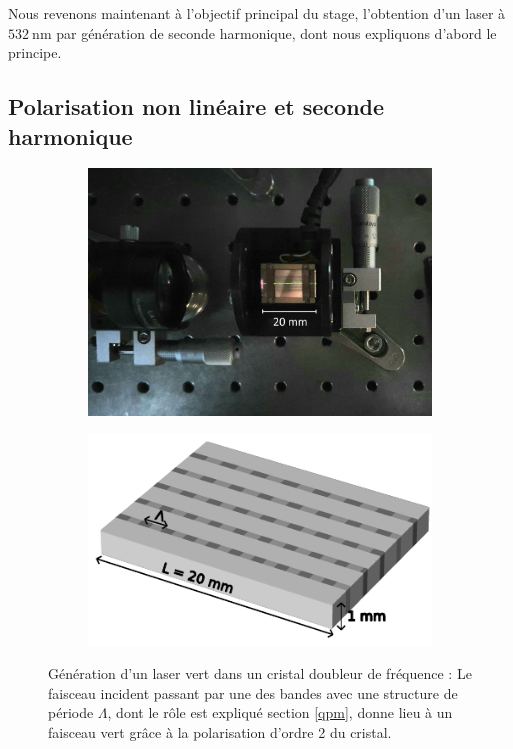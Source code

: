 \documentclass[11pt,a4paper]{article}
\newcommand{\lmbd}[1]{$\SI{#1}{\nano\metre}$}
\begin{document}
Nous revenons maintenant à l'objectif principal du stage, l'obtention d'un laser à \lmbd{532} par génération de seconde harmonique, dont nous expliquons d'abord le principe.

\subsection{Polarisation non linéaire et seconde harmonique} 

\begin{figure}[h]
\centering
\begin{subfigure}{0.45\textwidth}
	\includegraphics[width=\textwidth]{./img/cristal clair.jpg}
\end{subfigure}
\begin{subfigure}{0.5\textwidth}
	\includegraphics[width=\textwidth]{./img/cristal.pdf}
\end{subfigure}
\caption{Génération d'un laser vert dans un cristal doubleur de fréquence : \small Le faisceau incident passant par une des bandes avec une structure de période $\Lambda$, dont le rôle est expliqué section \ref{qpm}, donne lieu à un faisceau vert grâce à la polarisation d'ordre 2 du cristal.}
\label{fig:cristal}
\end{figure}
\end{document}
